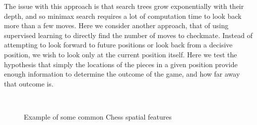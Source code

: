 \documentclass[fleqn]{article}
\begin{document}
The issue with this approach is that search trees grow exponentially with their depth, and so minimax search requires a lot of computation time to look back more than a few moves. Here we consider another approach, that of using supervised learning to directly find the number of moves to checkmate. Instead of attempting to look forward to future positions or look back from a decisive position, we wish to look only at the current position itself. Here we test the hypothesis that simply the locations of the pieces in a given position provide enough information to determine the outcome of the game, and how far away that outcome is.
%
\begin{figure}[H]
	{\centering
		\mbox{
		\quad
		\quad
		}
		\caption{Example of some common Chess spatial features}
		\label{fig:ChessBoard}
	}
\end{figure}
%
\end{document}
